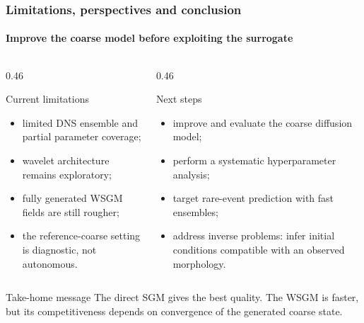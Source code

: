 \documentclass[t,10pt,aspectratio=169]{beamer}
\begin{document}
\begin{frame}
  \frametitle{Limitations, perspectives and conclusion}
  \framesubtitle{Improve the coarse model before exploiting the surrogate}
  \begin{columns}[T,onlytextwidth]
    \begin{column}{0.46\textwidth}
      \begin{alertblock}{Current limitations}
        \small
        \begin{itemize}
          \item limited DNS ensemble and partial parameter coverage;
          \item wavelet architecture remains exploratory;
          \item fully generated WSGM fields are still rougher;
          \item the reference-coarse setting is diagnostic, not autonomous.
        \end{itemize}
      \end{alertblock}
    \end{column}
    \begin{column}{0.46\textwidth}
      \begin{block}{Next steps}
        \small
        \begin{itemize}
          \item improve and evaluate the coarse diffusion model;
          \item perform a systematic hyperparameter analysis;
          \item target rare-event prediction with fast ensembles;
          \item address inverse problems: infer initial conditions compatible with an observed morphology.
        \end{itemize}
      \end{block}
    \end{column}
  \end{columns}
  \vspace{-0.45cm}
  \begin{exampleblock}{Take-home message}
    \centering\footnotesize The direct SGM gives the best quality. The WSGM is faster, but its competitiveness depends on convergence of the generated coarse state.
  \end{exampleblock}
\end{frame}

\begin{frame}[plain]
\end{frame}
\end{document}

